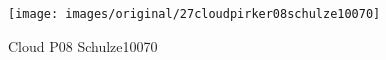 \begin{figure}[!h] 
\centering 
\texttt{[image: images/original/27cloudpirker08schulze10070]}
\caption{Cloud P08 Schulze10070}
\label{fig:27cloudpirker08schulze10070} 
\end{figure}

